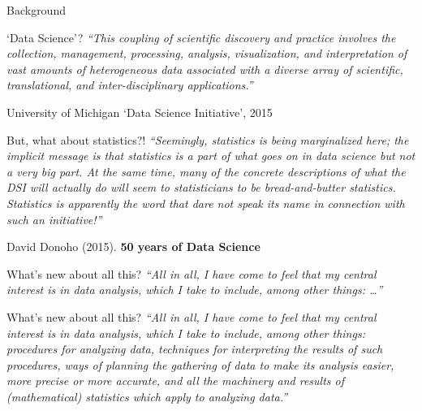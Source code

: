 \documentclass[
  ignorenonframetext,
]{beamer}
\begin{document}
\begin{frame}{Background}
\protect\hypertarget{background}{}
\begin{block}{`Data Science'?}
\protect\hypertarget{data-science}{}
\emph{``This coupling of scientific discovery and practice involves the
collection, management, processing, analysis, visualization, and
interpretation of vast amounts of heterogeneous data associated with a
diverse array of scientific, translational, and inter-disciplinary
applications.''}

University of Michigan `Data Science Initiative', 2015
\end{block}

\begin{block}{But, what about statistics?!}
\protect\hypertarget{but-what-about-statistics}{}
\emph{``Seemingly, statistics is being marginalized here; the implicit
message is that statistics is a part of what goes on in data science but
not a very big part. At the same time, many of the concrete descriptions
of what the DSI will actually do will seem to statisticians to be
bread-and-butter statistics. Statistics is apparently the word that dare
not speak its name in connection with such an initiative!''}

David Donoho (2015). \textbf{50 years of Data Science}
\end{block}

\begin{block}{What's new about all this?}
\protect\hypertarget{whats-new-about-all-this}{}
\emph{``All in all, I have come to feel that my central interest is in
data analysis, which I take to include, among other things: \ldots{}''}
\end{block}

\begin{block}{What's new about all this?}
\protect\hypertarget{whats-new-about-all-this-1}{}
\emph{``All in all, I have come to feel that my central interest is in
data analysis, which I take to include, among other things: procedures
for analyzing data, techniques for interpreting the results of such
procedures, ways of planning the gathering of data to make its analysis
easier, more precise or more accurate, and all the machinery and results
of (mathematical) statistics which apply to analyzing data.''}
\end{block}


\end{frame}
\end{document}
